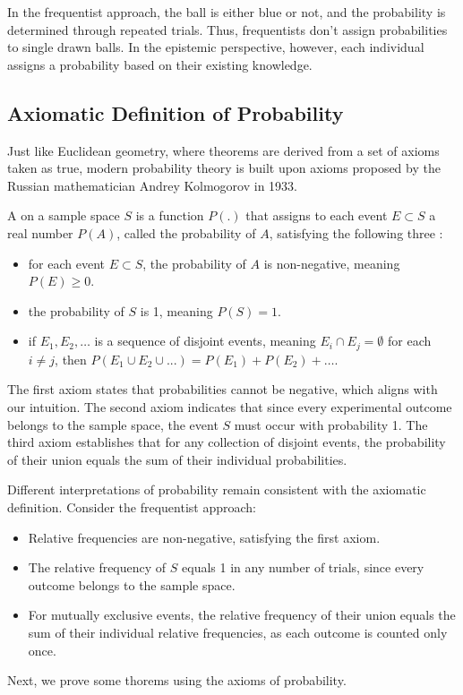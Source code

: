 In the frequentist approach, the ball is either blue or not, and the probability is determined through repeated trials.
Thus, frequentists don't assign probabilities to single drawn balls.
In the epistemic perspective, however, each individual assigns a probability based on their existing knowledge.

\subsection{Axiomatic Definition of Probability}

Just like Euclidean geometry, where theorems are derived from a set of axioms taken as true,
modern probability theory is built upon axioms proposed by the Russian mathematician Andrey Kolmogorov in 1933.

A  on a sample space \( S \) is a function \( P(.) \) that assigns
to each event \( E \subset S \) a real number \( P(A) \), called the probability of \( A \),
satisfying the following three :
\begin{itemize}
	\item for each event \( E \subset S \), the probability of \( A \) is non-negative, meaning \( P(E) \geq 0 \).
	\item the probability of \( S \) is 1, meaning \( P(S) = 1 \).
	\item if \( E_1, E_2, \ldots \) is a sequence of disjoint events, meaning \( E_i \cap E_j = \emptyset \) for each \( i \neq j \), then \( P(E_1 \cup E_2 \cup ...) = P(E_1) + P(E_2) + \ldots \).
\end{itemize}
The first axiom states that probabilities cannot be negative, which aligns with our intuition.
The second axiom indicates that since every experimental outcome belongs to the sample space, the event 
\( S \) must occur with probability 1.
The third axiom establishes that for any collection of disjoint events, the probability of their union equals the sum of their individual probabilities.

Different interpretations of probability remain consistent with the axiomatic definition.
Consider the frequentist approach:
\begin{itemize}
	\item Relative frequencies are non-negative, satisfying the first axiom.
	\item The relative frequency of \( S \) equals 1 in any number of trials, since every outcome belongs to the sample space.
	\item For mutually exclusive events, the relative frequency of their union equals the sum of their individual relative frequencies, as each outcome is counted only once.
\end{itemize}
Next, we prove some thorems using the axioms of probability.

